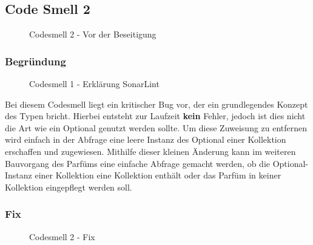 		
		
	\subsection{Code Smell 2}
	\begin{figure}[h]
		\centering
		\caption{Codesmell 2 - Vor der Beseitigung}
	\end{figure}
	
		\subsubsection{Begründung}
		\begin{figure}[h]
			\centering
			\caption{Codesmell 1 - Erklärung SonarLint}
		\end{figure}
		Bei diesem Codesmell liegt ein kritischer Bug vor, der ein grundlegendes Konzept des Typen  bricht. Hierbei entsteht zur Laufzeit \textbf{kein} Fehler, jedoch ist dies nicht die Art wie ein Optional genutzt werden sollte. Um diese Zuweisung zu entfernen wird einfach in der Abfrage eine leere Instanz des Optional einer Kollektion erschaffen und zugewiesen. Mithilfe dieser kleinen Änderung kann im weiteren Bauvorgang des Parfüms eine einfache Abfrage gemacht werden, ob die Optional-Instanz einer Kollektion eine Kollektion enthält oder das Parfüm in keiner Kollektion eingepflegt werden soll.
		
		\subsubsection{Fix}
		\begin{figure}[h]
			\centering
			\caption{Codesmell 2 - Fix}
		\end{figure}
